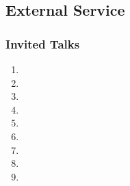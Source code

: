 
\hypertarget{external-service}{%
\subsection{External Service}\label{external-service}}

\hypertarget{talks}{%
\subsubsection{Invited Talks}\label{talks}}

\begin{enumerate}
\tightlist
\item {}
\item {}
\item {}
\item {}
\item {}
\item {}
\item {}
\item {}
\item {}
\end{enumerate}

